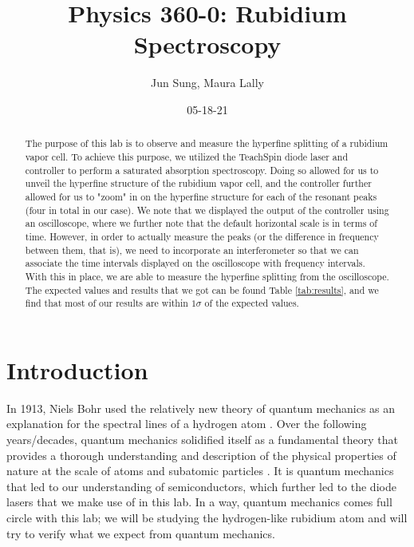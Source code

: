 \documentclass[twocolumn,amsmath,amssymb,pra, floatfix]{revtex4-2}
\begin{document}
\title{Physics 360-0: Rubidium Spectroscopy}

\author{Jun Sung, Maura Lally}

\date{05-18-21}

\begin{abstract}
The purpose of this lab is to observe and measure the hyperfine splitting of a rubidium vapor cell. To achieve this purpose, we utilized the TeachSpin diode laser and controller to perform a saturated absorption spectroscopy. Doing so allowed for us to unveil the hyperfine structure of the rubidium vapor cell, and the controller further allowed for us to "zoom" in on the hyperfine structure for each of the resonant peaks (four in total in our case). We note that we displayed the output of the controller using an oscilloscope, where we further note that the default horizontal scale is in terms of time. However, in order to actually measure the peaks (or the difference in frequency between them, that is), we need to incorporate an interferometer so that we can associate the time intervals displayed on the oscilloscope with frequency intervals. With this in place, we are able to measure the hyperfine splitting from the oscilloscope. The expected values and results that we got can be found Table \ref{tab:results}, and we find that most of our results are within $1 \sigma$ of the expected values. 
\end{abstract}

\maketitle

\section{Introduction}
In 1913, Niels Bohr used the relatively new theory of quantum mechanics as an explanation for the spectral lines of a hydrogen atom \cite{wiki:QMhist}. Over the following years/decades, quantum mechanics solidified itself as a fundamental theory that provides a thorough understanding and description of the physical properties of nature at the scale of atoms and subatomic particles \cite{wiki:QM}. It is quantum mechanics that led to our understanding of semiconductors, which further led to the diode lasers that we make use of in this lab. In a way, quantum mechanics comes full circle with this lab; we will be studying the hydrogen-like rubidium atom and will try to verify what we expect from quantum mechanics. 
\end{document}
